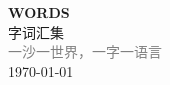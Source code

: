 \vspace*{\fill}
\begin{center}
    \textcolor{pink!50}{\Huge\textbf{WORDS}} \\[1em]
    \textcolor{pink!60!pink}{\Large 字词汇集} \\[2em]
    \textcolor{gray}{\large 一沙一世界，一字一语言} \\[1em]
    \today
\end{center}
\vspace*{\fill}
\clearpage


\clearpage

\clearpage

\clearpage


